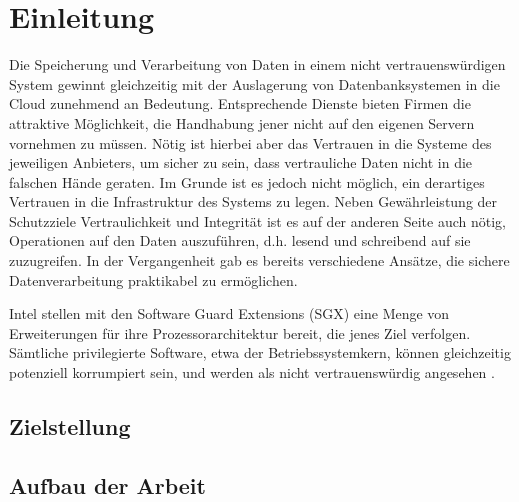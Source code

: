 
\chapter{Einleitung}

Die Speicherung und Verarbeitung von Daten in einem nicht vertrauenswürdigen System gewinnt gleichzeitig mit der Auslagerung von Datenbanksystemen in die Cloud zunehmend an Bedeutung. Entsprechende Dienste bieten Firmen die attraktive Möglichkeit, die Handhabung jener nicht auf den eigenen Servern vornehmen zu müssen. Nötig ist hierbei aber das Vertrauen in die Systeme des jeweiligen Anbieters, um sicher zu sein, dass vertrauliche Daten nicht in die falschen Hände geraten. Im Grunde ist es jedoch nicht möglich, ein derartiges Vertrauen in die Infrastruktur des Systems zu legen. 
Neben Gewährleistung der Schutzziele Vertraulichkeit und Integrität ist es auf der anderen Seite auch nötig, Operationen auf den Daten auszuführen, d.h. lesend und schreibend auf sie zuzugreifen. In der Vergangenheit gab es bereits verschiedene Ansätze, die sichere Datenverarbeitung praktikabel zu ermöglichen.
 
Intel stellen mit den Software Guard Extensions (SGX) eine Menge von Erweiterungen für ihre Prozessorarchitektur bereit, die jenes Ziel verfolgen. Sämtliche privilegierte Software, etwa der Betriebssystemkern, können gleichzeitig potenziell korrumpiert sein, und werden als nicht vertrauenswürdig angesehen \cite{Costan2016}.

\section{Zielstellung}

\section{Aufbau der Arbeit}